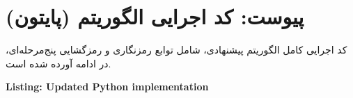 
\chapter{پیوست: کد اجرایی الگوریتم (پایتون)}
\label{ch:appendix_code}

کد اجرایی کامل الگوریتم پیشنهادی، شامل توابع رمزنگاری و رمزگشایی پنج‌مرحله‌ای، در ادامه آورده شده است.

\begin{latin}
\noindent\textbf{Listing: Updated Python implementation}
\label{lst:appendix-code}

\end{latin}
